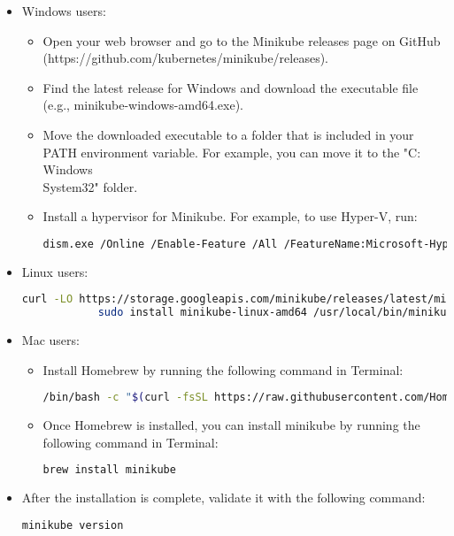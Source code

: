 \begin{itemize}
	\begin{itemize}
		\item Windows users:	
		\begin{itemize}
			\item Open your web browser and go to the Minikube releases page on GitHub (https://github.com/kubernetes/minikube/releases).
			\item Find the latest release for Windows and download the executable file (e.g., minikube-windows-amd64.exe).
			\item Move the downloaded executable to a folder that is included in your PATH environment variable. For example, you can move it to the "C:\\Windows\\System32" folder.
			\item Install a hypervisor for Minikube. For example, to use Hyper-V, run:
			\begin{lstlisting}[language=bash]
				dism.exe /Online /Enable-Feature /All /FeatureName:Microsoft-Hyper-V
			\end{lstlisting}
		\end{itemize}
		\item Linux users:
		\begin{lstlisting}[language=bash]
			curl -LO https://storage.googleapis.com/minikube/releases/latest/minikube-linux-amd64
			sudo install minikube-linux-amd64 /usr/local/bin/minikube
		\end{lstlisting}
		\item Mac users:
		\begin{itemize}
			\item Install Homebrew by running the following command in Terminal:
			\begin{lstlisting}[language=bash]
				/bin/bash -c "$(curl -fsSL https://raw.githubusercontent.com/Homebrew/install/HEAD/install.sh)"
			\end{lstlisting}

			\item Once Homebrew is installed, you can install minikube by running the following command in Terminal:
			\begin{lstlisting}[language=bash]
				brew install minikube
			\end{lstlisting}
		\end{itemize}
		\item After the installation is complete, validate it with the following command:
		\begin{lstlisting}[language=bash]
			minikube version
		\end{lstlisting}	
	\end{itemize}


\end{itemize}
